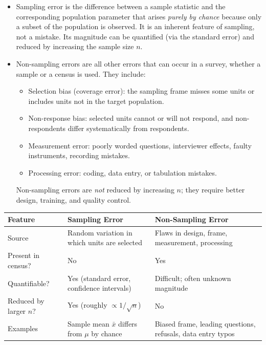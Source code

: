 \documentclass[11pt]{article}
\newcommand{\cle}[1]{{\popxbold\color{popdark}#1}}
\begin{document}
\begin{definition}
\begin{itemize}
\item \cle{Sampling error} is the difference between a sample statistic and the corresponding population parameter that arises \emph{purely by chance} because only a subset of the population is observed. It is an inherent feature of sampling, not a mistake. Its magnitude can be quantified (via the standard error) and reduced by increasing the sample size $n$.
\item \cle{Non-sampling errors} are all other errors that can occur in a survey, whether a sample or a census is used. They include:
      \begin{itemize}
      \item \cle{Selection bias} (coverage error): the sampling frame misses some units or includes units not in the target population.
      \item \cle{Non-response bias}: selected units cannot or will not respond, and non-respondents differ systematically from respondents.
      \item \cle{Measurement error}: poorly worded questions, interviewer effects, faulty instruments, recording mistakes.
      \item \cle{Processing error}: coding, data entry, or tabulation mistakes.
      \end{itemize}
      Non-sampling errors are \emph{not} reduced by increasing $n$; they require better design, training, and quality control.
\end{itemize}
\end{definition}

\begin{aretenir}
\begin{center}
\begin{tabularx}{\linewidth}{|l|X|X|}
\hline
\rowcolor{popblueL} \textbf{Feature} & \textbf{Sampling Error} & \textbf{Non-Sampling Error} \\
\hline
Source & Random variation in which units are selected & Flaws in design, frame, measurement, processing \\
\hline
Present in census? & No & Yes \\
\hline
Quantifiable? & Yes (standard error, confidence intervals) & Difficult; often unknown magnitude \\
\hline
Reduced by larger $n$? & Yes (roughly $\propto 1/\sqrt{n}$) & No \\
\hline
Examples & Sample mean $\bar{x}$ differs from $\mu$ by chance & Biased frame, leading questions, refusals, data entry typos \\
\hline
\end{tabularx}
\end{center}
\end{aretenir}
\end{document}
